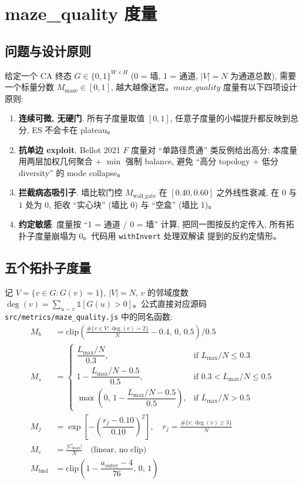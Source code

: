 
\section{maze\_quality 度量}
\label{sec:mazequality}

\subsection{问题与设计原则}

给定一个 CA 终态 $G \in \{0,1\}^{W \times H}$ (0 = 墙, 1 = 通道, $|V| = N$ 为通道总数), 需要一个标量分数 $M_{\text{maze}} \in [0, 1]$, 越大越像迷宫。$maze\_quality$ 度量有以下四项设计原则:
\begin{enumerate}[leftmargin=*, itemsep=0pt, topsep=0pt]
  \item \textbf{连续可微, 无硬门}. 所有子度量取值 $[0, 1]$, 任意子度量的小幅提升都反映到总分, ES 不会卡在 plateau。
  \item \textbf{抗单边 exploit}. Bellot 2021 $F$ 度量对 ``单路径贯通'' 类反例给出高分; 本度量用两层加权几何聚合 + $\min$ 强制 balance, 避免 ``高分 topology + 低分 diversity'' 的 mode collapse。
  \item \textbf{拦截病态吸引子}. 墙比软门控 $M_{\text{wall\_gate}}$ 在 $[0.40, 0.60]$ 之外线性衰减, 在 $0$ 与 $1$ 处为 0, 拒收 ``实心块'' (墙比 0) 与 ``空盒'' (墙比 1)。
  \item \textbf{约定敏感}. 度量按 ``1 = 通道 / 0 = 墙'' 计算, 把同一图按反约定传入, 所有拓扑子度量崩塌为 0。代码用 \texttt{withInvert} 处理双解读 \cite{bellot2021} 提到的反约定情形。
\end{enumerate}

\subsection{五个拓扑子度量}

记 $V = \{v \in G : G(v) = 1\}$, $|V| = N$, $v$ 的邻域度数 $\deg(v) = \sum_{u \sim v} \mathbb{1}[G(u) > 0]$。公式直接对应源码 \texttt{src/metrics/maze\_quality.js} 中的同名函数:
\begin{align}
  M_b &= \mathrm{clip}\!\left(\frac{\#\{v \in V : \deg(v) = 2\}}{N} - 0.4,\, 0,\, 0.5\right) \big/ 0.5 \label{eq:mb}\\
  M_s &= \begin{cases}
    \dfrac{L_{\max}/N}{0.3}, & \text{if } L_{\max}/N \le 0.3 \\
    1 - \dfrac{L_{\max}/N - 0.5}{0.5}, & \text{if } 0.3 < L_{\max}/N \le 0.5 \\
    \max\!\left(0,\, 1 - \dfrac{L_{\max}/N - 0.5}{0.5}\right), & \text{if } L_{\max}/N > 0.5
  \end{cases} \label{eq:ms}\\
  M_j &= \exp\!\left[-\left(\dfrac{r_j - 0.10}{0.10}\right)^{2}\right], \quad r_j = \frac{\#\{v : \deg(v) \ge 3\}}{N} \label{eq:mj}\\
  M_c &= \frac{|C_{\max}|}{N} \quad \text{(linear, no clip)} \label{eq:mc}\\
  M_{\text{bnd}} &= \mathrm{clip}\!\left(1 - \dfrac{a_{\text{outer}} - 4}{76},\, 0,\, 1\right) \label{eq:mbnd}
\end{align}

